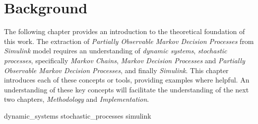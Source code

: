 \chapter{Background}
\label{background}

The following chapter provides an introduction to the theoretical foundation of this work. The extraction of \textit{Partially Observable Markov Decision Processes} from \textit{Simulink} model requires an understanding of \textit{dynamic systems}, \textit{stochastic processes}, specifically \textit{Markov Chains}, \textit{Markov Decision Processes} and \textit{Partially Observable Markov Decision Processes}, and finally \textit{Simulink}. This chapter introduces each of these concepts or tools, providing examples where helpful. An understanding of these key concepts will facilitate the understanding of the next two chapters, \textit{Methodology} and \textit{Implementation}.

{dynamic_systems}
{stochastic_processes}
{simulink}            
